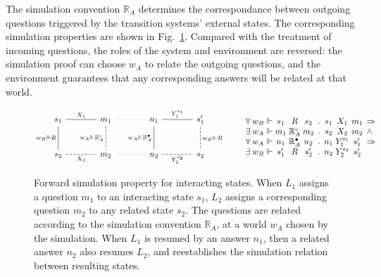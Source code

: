 \documentclass[acmsmall,screen,review,anonymous]{acmart}
\newcommand{\que}{\circ}
\newcommand{\ans}{\bullet}
\begin{document}
The simulation convention $\mathbb{R}_A$
determines the correspondance between
outgoing questions triggered by
the transition systems' external states.
The corresponding simulation properties
are shown in Fig.~\ref{fig:fsim-ext}.
Compared with the treatment of incoming questions,
the roles of the system and environment are reversed:
the simulation proof can choose $w_A$
to relate the outgoing questions,
and the environment guarantees that any corresponding answers
will be related at that world.

\begin{figure} %
  \[
      \begin{tikzcd}[sep=large,baseline=-3pt]
        s_1 \ar[r, "X_1", dash] \ar[d, "w_B \Vdash R"', dash] &
        m_1 \ar[r, dotted, dash] \ar[d, "w_A \Vdash \mathbb{R}_A^\que"', dash, dashed] &
        n_1 \ar[r, "Y_1^{s_1}", dash] \ar[d, "w_A \Vdash \mathbb{R}_A^\ans"', dash] &
        s_1' \ar[d, "w_B \Vdash R", dash, dashed]
        \\
        s_2 \ar[r, "X_2"', dash, dashed] &
        m_2 \ar[r, dotted, dash] &
        n_2 \ar[r, "Y_2^{s_2}"', dash, dashed] &
        s_2
      \end{tikzcd}
      \qquad
      \begin{array}{
          c @{\:} l @{{} \Vdash {}} c@{}c@{}c @{\:\:.\:\:}
                                    c@{}c@{}c @{\:\:} l}
        \forall & w_B & s_1 & {}\mathrel{R}{} & s_2 &
                        s_1 & {}\mathrel{X_1}{} & m_1 & \Rightarrow \\
        \exists & w_A & m_1 & {}\mathrel{\mathbb{R}_A^\que}{} & m_2 &
                        s_2 & {}\mathrel{X_2}{} & m_2 & \wedge \\
        \forall & w_A & n_1 & {}\mathrel{\mathbb{R}_A^\ans}{} & n_2 &
                        n_1 & {}\mathrel{Y_1^{s_1}}{} & s_1' & \Rightarrow \\
        \exists & w_B & s_1' & {}\mathrel{R}{} & s_2' &
                        n_2 & {}\mathrel{Y_2^{s_2}}{} & s_2' &
      \end{array}
      \quad
  \]
  \caption{Forward simulation property for interacting states.
    When $L_1$ assigns a question $m_1$ to an interacting state $s_1$,
    $L_2$ assigns a corresponding question $m_2$ to any related state $s_2$.
    The questions are related according to
    the simulation convention $\mathbb{R}_A$,
    at a world $w_A$ chosen by the simulation.
    When $L_1$ is resumed by an answer $n_1$,
    then a related answer $n_2$ also resumes $L_2$,
    and reestablishes the simulation relation
    between resulting states.}
  \label{fig:fsim-ext}
\end{figure}
\end{document}
